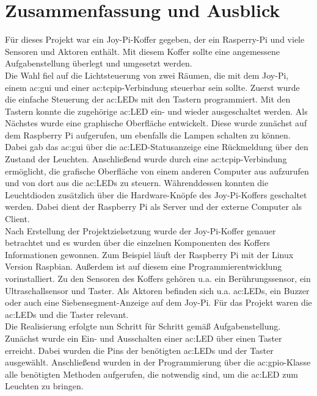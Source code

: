 \chapter{Zusammenfassung und Ausblick}

Für dieses Projekt war ein Joy-Pi-Koffer gegeben, der ein Rasperry-Pi und viele Sensoren und Aktoren enthält. Mit diesem Koffer sollte eine angemessene Aufgabenstellung überlegt und umgesetzt werden.\\[0.2cm]
Die Wahl fiel auf die Lichtsteuerung von zwei Räumen, die mit dem Joy-Pi, einem \gls{ac:gui} und einer \gls{ac:tcpip}-Verbindung steuerbar sein sollte. Zuerst wurde die einfache Steuerung der \gls{ac:LED}s mit den Tastern programmiert. Mit den Tastern konnte die zugehörige \gls{ac:LED} ein- und wieder ausgeschaltet werden. Als Nächstes wurde eine graphische Oberfläche entwickelt. Diese wurde zunächst auf dem Raspberry Pi aufgerufen, um ebenfalls die Lampen schalten zu können. Dabei gab das \gls{ac:gui} über die \gls{ac:LED}-Statusanzeige eine Rückmeldung über den Zustand der Leuchten. Anschließend wurde durch eine \gls{ac:tcpip}-Verbindung ermöglicht, die grafische Oberfläche von einem anderen Computer aus aufzurufen und von dort aus die \gls{ac:LED}s zu steuern. Währenddessen konnten die Leuchtdioden zusätzlich über die Hardware-Knöpfe des Joy-Pi-Koffers geschaltet werden. Dabei dient der Raspberry Pi als Server und der externe Computer als Client.\\[0.2cm]
Nach Erstellung der Projektzielsetzung wurde der Joy-Pi-Koffer genauer betrachtet und es wurden über die einzelnen Komponenten des Koffers Informationen gewonnen. Zum Beispiel läuft der Raspberry Pi mit der Linux Version Raspbian. Außerdem ist auf diesem eine Programmierentwicklung vorinstalliert. Zu den Sensoren des Koffers gehören u.a. ein Berührungssensor, ein Ultraschallsensor und Taster. Als Aktoren befinden sich u.a. \gls{ac:LED}s, ein Buzzer oder auch eine Siebensegment-Anzeige auf dem Joy-Pi. Für das Projekt waren die \gls{ac:LED}s und die Taster relevant. \\[0.2cm]
Die Realisierung erfolgte nun Schritt für Schritt gemäß Aufgabenstellung. Zunächst wurde ein Ein- und Ausschalten einer \gls{ac:LED} über einen Taster erreicht. Dabei wurden die Pins der benötigten \gls{ac:LED}s und der Taster ausgewählt. Anschließend wurden in der Programmierung über die \gls{ac:gpio}-Klasse alle benötigten Methoden aufgerufen, die notwendig sind, um die \gls{ac:LED} zum Leuchten zu bringen.
